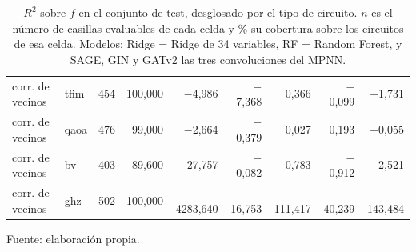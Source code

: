 \begin{table}[htbp]
{\begin{tabular}{@{}llrrrrrrr@{}}
        corr. de vecinos & tfim & 454 & 100,000 & $-$4,986 & $-$7,368 & 0,366 & $-$0,099 & $-$1,731 \\
        corr. de vecinos & qaoa & 476 & 99,000 & $-$2,664 & $-$0,379 & 0,027 & 0,193 & $-$0,055 \\
        corr. de vecinos & bv & 403 & 89,600 & $-$27,757 & $-$0,082 & $-$0,783 & $-$0,912 & $-$2,521 \\
        corr. de vecinos & ghz & 502 & 100,000 & $-$4283,640 & $-$16,753 & $-$111,417 & $-$40,239 & $-$143,484 \\
        \bottomrule
    \end{tabular}}

    \caption{$R^2$ sobre $f$ en el conjunto de test, desglosado por el tipo de circuito. $n$ es el número de casillas evaluables de cada celda y \% su cobertura sobre los circuitos de esa celda. Modelos: Ridge = Ridge de 34 variables, RF = Random Forest, y SAGE, GIN y GATv2 las tres convoluciones del MPNN.}
    \label{tab:v2_tipo_r2_f}

    {\footnotesize Fuente: elaboración propia.}
\end{table}

